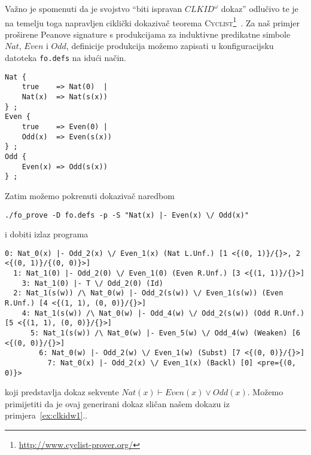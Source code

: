 Važno je spomenuti da je svojstvo \enquote{biti ispravan \(\mathit{CLKID}^{\omega}\) dokaz} odlučivo
te je na temelju toga napravljen ciklički dokazivač teorema \textsc{Cyclist}\footnote{\url{http://www.cyclist-prover.org/}}~\cite{cyclist}.
Za naš primjer proširene Peanove signature s produkcijama za induktivne predikatne simbole
\(\mathit{Nat}\), \(\mathit{Even}\) i \(\mathit{Odd}\),
definicije produkcija možemo zapisati u konfiguracijsku datoteka \texttt{fo.defs}
na idući način.
\begin{verbatim}
Nat { 
    true    => Nat(0)  | 
    Nat(x)  => Nat(s(x)) 
} ;
Even {
    true    => Even(0) |
    Odd(x)  => Even(s(x))
} ;
Odd {
    Even(x) => Odd(s(x))
} ;
\end{verbatim}
Zatim možemo pokrenuti dokazivač naredbom
\begin{verbatim}
./fo_prove -D fo.defs -p -S "Nat(x) |- Even(x) \/ Odd(x)"
\end{verbatim}
i dobiti izlaz programa
\begin{scriptsize}
\begin{verbatim}
0: Nat_0(x) |- Odd_2(x) \/ Even_1(x) (Nat L.Unf.) [1 <{(0, 1)}/{}>, 2 <{(0, 1)}/{(0, 0)}>]
  1: Nat_1(0) |- Odd_2(0) \/ Even_1(0) (Even R.Unf.) [3 <{(1, 1)}/{}>]
    3: Nat_1(0) |- T \/ Odd_2(0) (Id)
  2: Nat_1(s(w)) /\ Nat_0(w) |- Odd_2(s(w)) \/ Even_1(s(w)) (Even R.Unf.) [4 <{(1, 1), (0, 0)}/{}>]
    4: Nat_1(s(w)) /\ Nat_0(w) |- Odd_4(w) \/ Odd_2(s(w)) (Odd R.Unf.) [5 <{(1, 1), (0, 0)}/{}>]
      5: Nat_1(s(w)) /\ Nat_0(w) |- Even_5(w) \/ Odd_4(w) (Weaken) [6 <{(0, 0)}/{}>]
        6: Nat_0(w) |- Odd_2(w) \/ Even_1(w) (Subst) [7 <{(0, 0)}/{}>]
          7: Nat_0(x) |- Odd_2(x) \/ Even_1(x) (Backl) [0] <pre={(0, 0)}>
\end{verbatim}
\end{scriptsize}
koji predstavlja dokaz sekvente \(\mathit{Nat}(x) \vdash \mathit{Even}(x) \lor \mathit{Odd}(x)\).
Možemo primijetiti da je ovaj generirani dokaz sličan našem dokazu iz primjera~\ref{ex:clkidw1}..

